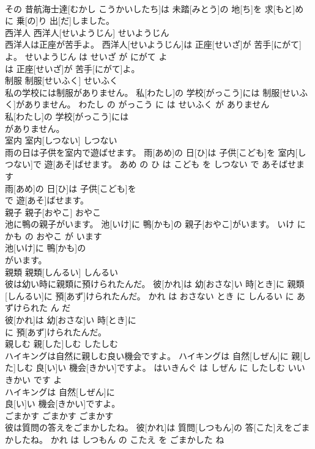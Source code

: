\documentclass[8pt]{extreport}
\begin{document}
\begin{CJK}{UTF8}{min}
\\	その 昔航海士達[むかし こうかいしたち]は 未踏[みとう]の 地[ち]を 求[もと]め
\\	に 乗[の]り 出[だ]しました。			
\\	西洋人	西洋人[せいようじん]	せいようじん	
\\	西洋人は正座が苦手よ。	西洋人[せいようじん]は 正座[せいざ]が 苦手[にがて]よ。	せいようじん は せいざ が にがて よ	
\\	は 正座[せいざ]が 苦手[にがて]よ。			
\\	制服	制服[せいふく]	せいふく	
\\	私の学校には制服がありません。	私[わたし]の 学校[がっこう]には 制服[せいふく]がありません。	わたし の がっこう に は せいふく が ありません	
\\	私[わたし]の 学校[がっこう]には
\\	がありません。			
\\	室内	室内[しつない]	しつない	
\\	雨の日は子供を室内で遊ばせます。	雨[あめ]の 日[ひ]は 子供[こども]を 室内[しつない]で 遊[あそ]ばせます。	あめ の ひ は こども を しつない で あそばせます	
\\	雨[あめ]の 日[ひ]は 子供[こども]を
\\	で 遊[あそ]ばせます。			
\\	親子	親子[おやこ]	おやこ	
\\	池に鴨の親子がいます。	池[いけ]に 鴨[かも]の 親子[おやこ]がいます。	いけ に かも の おやこ が います	
\\	池[いけ]に 鴨[かも]の
\\	がいます。			
\\	親類	親類[しんるい]	しんるい	
\\	彼は幼い時に親類に預けられたんだ。	彼[かれ]は 幼[おさな]い 時[とき]に 親類[しんるい]に 預[あず]けられたんだ。	かれ は おさない とき に しんるい に あずけられた ん だ	
\\	彼[かれ]は 幼[おさな]い 時[とき]に
\\	に 預[あず]けられたんだ。			
\\	親しむ	親[した]しむ	したしむ	
\\	ハイキングは自然に親しむ良い機会ですよ。	ハイキングは 自然[しぜん]に 親[した]しむ 良[い]い 機会[きかい]ですよ。	はいきんぐ は しぜん に したしむ いい きかい です よ	
\\	ハイキングは 自然[しぜん]に
\\	良[い]い 機会[きかい]ですよ。			
\\	ごまかす	ごまかす	ごまかす	
\\	彼は質問の答えをごまかしたね。	彼[かれ]は 質問[しつもん]の 答[こた]えをごまかしたね。	かれ は しつもん の こたえ を ごまかした ね	

\end{CJK}
\end{document}
